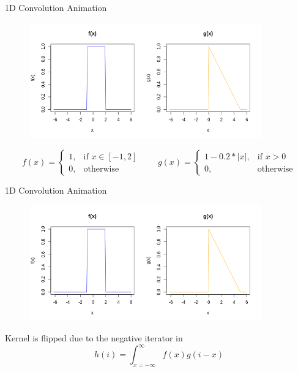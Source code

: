 \begin{vbframe}{1D Convolution Animation}
    \begin{figure}
    \centering
    \includegraphics[width=10cm]{plots/conv_animations/conv_static.png}
    \end{figure}
    \begin{equation*}
        f(x)=
        \begin{cases}
            1, & \text{if } x\in [-1, 2]\\
            0, & \text{otherwise}
        \end{cases}
        \qquad
        g(x)=
        \begin{cases}
            1 - 0.2*|x|, & \text{if } x > 0\\
            0, & \text{otherwise}
        \end{cases}
    \end{equation*}
\end{vbframe}

\begin{vbframe}{1D Convolution Animation}
    \begin{figure}
    \centering
    \includegraphics[width=10cm]{plots/conv_animations/conv_static.png}
    \end{figure}
    Kernel is flipped due to the negative iterator in $$h(i) = \int_{x = -\infty}^{\infty} f(x)g(i-x)$$
\end{vbframe}

